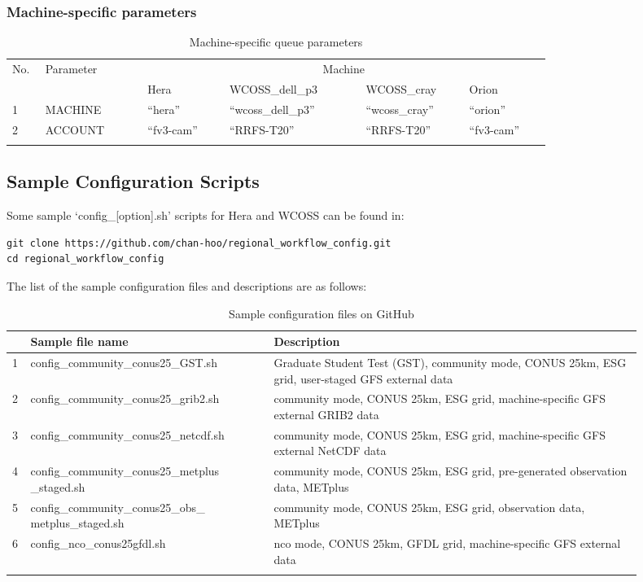 \documentclass[11pt,fleqn]{report}              %
\begin{document}
\subsubsection{Machine-specific parameters}
{
\fontsize{10}{12}\selectfont
\begin{longtable}{p{0.03\linewidth} | p{0.15\linewidth} | p{0.12\linewidth} | p{0.2\linewidth} | p{0.15\linewidth}  | p{0.12\linewidth}}
\hline
\hline
\multirow{2}{*}{No.} & \multirow{2}{*}{Parameter} & \multicolumn{4}{c}{Machine}     \\
\cline{3-6}
 &  & Hera & WCOSS\_dell\_p3 & WCOSS\_cray  & Orion \\
\hline
1 & MACHINE & ``hera'' & ``wcoss\_dell\_p3'' & ``wcoss\_cray'' & ``orion'' \\
2 & ACCOUNT & ``fv3-cam''  & ``RRFS-T20'' & ``RRFS-T20'' & ``fv3-cam'' \\
\hline
\caption{Machine-specific queue parameters}
\label{table:machine_queue_parm}
\end{longtable}
}




\subsection{Sample Configuration Scripts}
\label{subsec:config_samples}

Some sample `config\_[option].sh' scripts for Hera and WCOSS can be found in:
\lstset{language=bash}   
\begin{lstlisting}[frame=trBL]
git clone https://github.com/chan-hoo/regional_workflow_config.git
cd regional_workflow_config
\end{lstlisting}

The list of the sample configuration files and descriptions are as follows:
{
\fontsize{10}{12}\selectfont
\begin{longtable}{ p{0.02\linewidth} | p{0.35\linewidth} | p{0.53\linewidth} }
\hline
\hline
& Sample file name & Description \\
\hline
1 & config\_community\_conus25\_GST.sh & Graduate Student Test (GST), community mode, CONUS 25km, ESG grid, user-staged GFS external data \\
2 & config\_community\_conus25\_grib2.sh & community mode, CONUS 25km, ESG grid, machine-specific GFS external GRIB2 data  \\
3 & config\_community\_conus25\_netcdf.sh & community mode, CONUS 25km, ESG grid, machine-specific GFS external NetCDF data  \\
4 & config\_community\_conus25\_metplus \_staged.sh & community mode, CONUS 25km, ESG grid, pre-generated observation data, METplus  \\
5 & config\_community\_conus25\_obs\_ metplus\_staged.sh & community mode, CONUS 25km, ESG grid, observation data, METplus \\
6 & config\_nco\_conus25gfdl.sh & nco mode, CONUS 25km, GFDL grid, machine-specific GFS external data \\
\hline
\caption{Sample configuration files on GitHub}
\label{table:sample_config_git}
\end{longtable}
}
\end{document}
